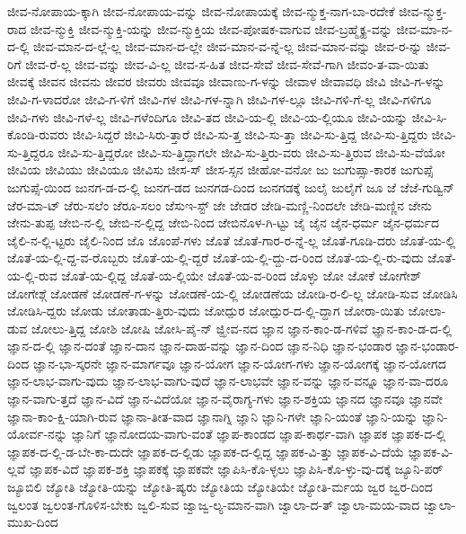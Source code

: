 {ಜೀವ-ನೋಪಾಯ-ಕ್ಕಾಗಿ
ಜೀವ-ನೋಪಾಯ-ವನ್ನು
ಜೀವ-ನೋಪಾಯಕ್ಕೆ
ಜೀವ-ನ್ಮುಕ್ತ-ನಾಗ-ಬಾ-ರದೇಕೆ
ಜೀವ-ನ್ಮುಕ್ತ-ರಾದ
ಜೀವ-ನ್ಮುಕ್ತಿ
ಜೀವ-ನ್ಮುಕ್ತಿ-ಯನ್ನು
ಜೀವ-ನ್ಮುಕ್ತಿಯ
ಜೀವ-ಪೋಷಕ-ವಾಗುವ
ಜೀವ-ಬ್ರಹ್ಮೈಕ್ಯ-ವನ್ನು
ಜೀವ-ಮಾ-ನ-ದ-ಲ್ಲಿ
ಜೀವ-ಮಾನ-ದ-ಲ್ಲೆ-ಲ್ಲ
ಜೀವ-ಮಾನ-ದ-ಲ್ಲೇ
ಜೀವ-ಮಾನ-ವ-ನ್ನೆ-ಲ್ಲ
ಜೀವ-ಮಾನ-ವನ್ನು
ಜೀವ-ರ-ನ್ನು
ಜೀವ-ರಿಗೆ
ಜೀವ-ರೆ-ಲ್ಲ
ಜೀವ-ವನ್ನು
ಜೀವ-ವಿ-ಲ್ಲ
ಜೀವ-ಸ-ಹಿತ
ಜೀವ-ಸೇವೆ
ಜೀವ-ಸೇವೆ-ಗಾಗಿ
ಜೀವಂ-ತ-ವಾ-ಯಿತು
ಜೀವಕ್ಕೆ
ಜೀವನ
ಜೀವನು
ಜೀವರ
ಜೀವರು
ಜೀವವೂ
ಜೀವಾಣು-ಗ-ಳನ್ನು
ಜೀವಾಳ
ಜೀವಾವಧಿ
ಜೀವಿ
ಜೀವಿ-ಗ-ಳನ್ನು
ಜೀವಿ-ಗ-ಳಾದರೋ
ಜೀವಿ-ಗ-ಳಿಗೆ
ಜೀವಿ-ಗಳ
ಜೀವಿ-ಗಳ-ನ್ನಾಗಿ
ಜೀವಿ-ಗಳ-ಲ್ಲೂ
ಜೀವಿ-ಗಳಿ-ಗೆ-ಲ್ಲ
ಜೀವಿ-ಗಳಿಗೂ
ಜೀವಿ-ಗಳು
ಜೀವಿ-ಗಳೆ-ಲ್ಲ
ಜೀವಿ-ಗಳೆಂದಿಗೂ
ಜೀವಿ-ತದ
ಜೀವಿ-ಯ-ಲ್ಲಿ
ಜೀವಿ-ಯ-ಲ್ಲಿಯೂ
ಜೀವಿ-ಯನ್ನು
ಜೀವಿ-ಸಿ-ಕೊಂಡಿ-ರುವರು
ಜೀವಿ-ಸಿದ್ದರೆ
ಜೀವಿ-ಸಿರು-ತ್ತಾರೆ
ಜೀವಿ-ಸು-ತ್ತ
ಜೀವಿ-ಸು-ತ್ತಾ
ಜೀವಿ-ಸು-ತ್ತಿದ್ದ
ಜೀವಿ-ಸು-ತ್ತಿದ್ದರು
ಜೀವಿ-ಸು-ತ್ತಿದ್ದರೂ
ಜೀವಿ-ಸು-ತ್ತಿದ್ದರೋ
ಜೀವಿ-ಸು-ತ್ತಿದ್ದಾಗಲೇ
ಜೀವಿ-ಸು-ತ್ತಿರು-ವರು
ಜೀವಿ-ಸು-ತ್ತಿರುವ
ಜೀವಿ-ಸು-ವೆಯೋ
ಜೀವಿಯ
ಜೀವಿಯು
ಜೀವಿಯೂ
ಜೀವಿಸು
ಜೀಸ-ಸ್
ಜೀಸ-ಸ್ಸನ
ಜೀಹೋ-ವನೋ
ಜು
ಜುಗುಪ್ಸಾ-ಕಾರಕ
ಜುಗುಪ್ಸೆ
ಜುಗುಪ್ಸೆ-ಯಿಂದ
ಜುನಗ-ಡ-ದ-ಲ್ಲಿ
ಜುನಗ-ಡದ
ಜುನಗಡ-ದಿಂದ
ಜುನಗಡಕ್ಕೆ
ಜುಲೈ
ಜುಲೈಗೆ
ಜೂ
ಜೆ
ಜೆಜೆ-ಗುಡ್ವಿನ್
ಜೆರ-ಮಾ-ಟ್
ಜೆರು-ಸಲೆಂ
ಜೆರೂ-ಸಲಂ
ಜೆಸುಇ-ಸ್ಟ್
ಜೇ
ಜೇಡರ
ಜೇಡಿ-ಮಣ್ಣಿ-ನಿಂದಲೇ
ಜೇಡಿ-ಮಣ್ಣಿನ
ಜೇನು
ಜೇನು-ತುಪ್ಪ
ಜೇಬಿ-ನ-ಲ್ಲಿ
ಜೇಬಿ-ನ-ಲ್ಲಿದ್ದ
ಜೇಬಿ-ನಿಂದ
ಜೇಬಿನೊಳ-ಗಿ-ಟ್ಟು
ಜೈ
ಜೈನ
ಜೈನ-ಧರ್ಮ
ಜೈನ-ಧರ್ಮದ
ಜೈಲಿ-ನ-ಲ್ಲಿ-ಟ್ಟರು
ಜೈಲಿ-ನಿಂದ
ಜೊ
ಜೊಂಪೆ-ಗಳು
ಜೊತೆ
ಜೊತೆ-ಗಾರ-ರ-ನ್ನೆ-ಲ್ಲ
ಜೊತೆ-ಗೂಡಿ-ದರು
ಜೊತೆ-ಯ-ಲ್ಲಿ
ಜೊತೆ-ಯ-ಲ್ಲಿ-ದ್ದ-ವ-ರೊಬ್ಬರು
ಜೊತೆ-ಯ-ಲ್ಲಿ-ದ್ದರೆ
ಜೊತೆ-ಯ-ಲ್ಲಿ-ದ್ದು-ದ-ರಿಂದ
ಜೊತೆ-ಯ-ಲ್ಲಿ-ರು-ವುದು
ಜೊತೆ-ಯ-ಲ್ಲಿ-ರುವ
ಜೊತೆ-ಯ-ಲ್ಲಿದ್ದ
ಜೊತೆ-ಯ-ಲ್ಲಿಯೇ
ಜೊತೆ-ಯ-ವ-ರಿಂದ
ಜೊಳ್ಳು
ಜೋ
ಜೋಕೆ
ಜೋಗೇಶ್
ಜೋಗೇಶ್ಗೆ
ಜೋಡಣೆ
ಜೋಡಣೆ-ಗ-ಳನ್ನು
ಜೋಡಣೆ-ಯ-ಲ್ಲಿ
ಜೋಡಣೆಯ
ಜೋಡಿ-ರ-ಲಿ-ಲ್ಲ
ಜೋಡಿ-ಸುವ
ಜೋಡಿಸಿ
ಜೋಡಿಸಿ-ದ್ದರು
ಜೋಡು
ಜೋತಾಡು-ತ್ತಿರು-ವುದು
ಜೋದ್ಪುರ
ಜೋದ್ಪುರ-ದ-ಲ್ಲಿ-ದ್ದಾಗ
ಜೋರಾ-ಯಿತು
ಜೋಲಾ-ಡುವ
ಜೋಲು-ತ್ತಿದ್ದ
ಜೋಶಿ
ಜೋಷಿ
ಜೋಸಿ-ಪೈ-ನ್
ಜ್ಝೀವ-ನದ
ಜ್ಞಾನ
ಜ್ಞಾನ-ಕಾಂ-ಡ-ಗಳಿವೆ
ಜ್ಞಾನ-ಕಾಂ-ಡ-ದ-ಲ್ಲಿ
ಜ್ಞಾನ-ದ-ಲ್ಲಿ
ಜ್ಞಾನ-ದಂತೆ
ಜ್ಞಾನ-ದಾನ
ಜ್ಞಾನ-ದಾಹ-ವನ್ನು
ಜ್ಞಾನ-ದಿಂದ
ಜ್ಞಾನ-ನಿಧಿ
ಜ್ಞಾನ-ಭಂಡಾರ
ಜ್ಞಾನ-ಭಂಡಾರ-ದಿಂದ
ಜ್ಞಾನ-ಭಾ-ಸ್ಕರನೇ
ಜ್ಞಾನ-ಮಾರ್ಗವೂ
ಜ್ಞಾನ-ಯೋಗ
ಜ್ಞಾನ-ಯೋಗ-ಗಳು
ಜ್ಞಾನ-ಯೋಗಕ್ಕೆ
ಜ್ಞಾನ-ಯೋಗದ
ಜ್ಞಾನ-ಲಾಭ-ವಾಗು-ವುದು
ಜ್ಞಾನ-ಲಾಭ-ವಾಗು-ವುದೆ
ಜ್ಞಾನ-ಲಾಭವೇ
ಜ್ಞಾನ-ವನ್ನು
ಜ್ಞಾನ-ವನ್ನೂ
ಜ್ಞಾನ-ವಾ-ದರೂ
ಜ್ಞಾನ-ವಾಗು-ತ್ತದೆ
ಜ್ಞಾನ-ವಿದೆ
ಜ್ಞಾನ-ವಿದೆಯೋ
ಜ್ಞಾನ-ವೈರಾಗ್ಯ-ಗಳು
ಜ್ಞಾನ-ಶಕ್ತಿಯ
ಜ್ಞಾನದ
ಜ್ಞಾನವೂ
ಜ್ಞಾನವೇ
ಜ್ಞಾನಾ-ಕಾಂ-ಕ್ಷಿ-ಯಾಗಿ-ರುವ
ಜ್ಞಾನಾ-ತೀತ-ವಾದ
ಜ್ಞಾನಾಗ್ನಿ
ಜ್ಞಾನಿ
ಜ್ಞಾನಿ-ಗಳೇ
ಜ್ಞಾನಿ-ಯಂತೆ
ಜ್ಞಾನಿ-ಯನ್ನು
ಜ್ಞಾನಿ-ಯೋರ್ವ-ನನ್ನು
ಜ್ಞಾನಿಗೆ
ಜ್ಞಾನೋದಯ-ವಾಗು-ವಂತೆ
ಜ್ಞಾಪ-ಕಾಂಡದ
ಜ್ಞಾಪ-ಕಾರ್ಥ-ವಾಗಿ
ಜ್ಞಾಪಕ
ಜ್ಞಾಪಕ-ದ-ಲ್ಲಿ
ಜ್ಞಾಪಕ-ದ-ಲ್ಲಿ-ಡ-ಬೇ-ಕಾ-ದುದೇ
ಜ್ಞಾಪಕ-ದ-ಲ್ಲಿಡು
ಜ್ಞಾಪಕ-ದ-ಲ್ಲಿದ್ದ
ಜ್ಞಾಪಕ-ವಿ-ತ್ತು
ಜ್ಞಾಪಕ-ವಿ-ದೆಯೆ
ಜ್ಞಾಪಕ-ವಿ-ಲ್ಲವೆ
ಜ್ಞಾಪಕ-ವಿದೆ
ಜ್ಞಾಪಕ-ಶಕ್ತಿ
ಜ್ಞಾಪಕಕ್ಕೆ
ಜ್ಞಾಪಕವೇ
ಜ್ಞಾಪಿಸಿ-ಕೊ-ಳ್ಳಲು
ಜ್ಞಾಪಿಸಿ-ಕೊ-ಳ್ಳು-ವು-ದಕ್ಕೆ
ಜ್ಯೂನಿ-ಪರ್
ಜ್ಯೂಬಿಲಿ
ಜ್ಯೋತಿ
ಜ್ಯೋತಿ-ಯನ್ನು
ಜ್ಯೋತಿ-ಷ್ಯರು
ಜ್ಯೋತಿಯ
ಜ್ಯೋತಿಯೇ
ಜ್ಯೋತಿ-ರ್ಮಯ
ಜ್ವರ
ಜ್ವರ-ದಿಂದ
ಜ್ವಲಂತ
ಜ್ವಲಂತ-ಗೊಳಿಸ-ಬೇಕು
ಜ್ವಲಿ-ಸುವ
ಜ್ವಾಜ್ವ-ಲ್ಯ-ಮಾನ-ವಾಗಿ
ಜ್ವಾಲಾ-ದ-ತ್
ಜ್ವಾಲಾ-ಮಯ-ವಾದ
ಜ್ವಾಲಾ-ಮುಖ-ದಿಂದ
}
